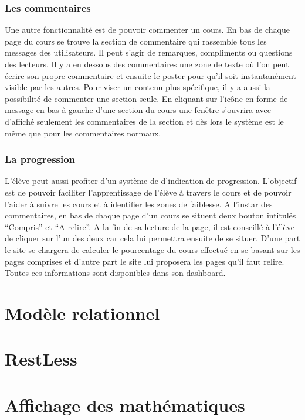 \documentclass[letterpaper,10pt,english]{sphinxmanual}
\begin{document}
\subsection{Les commentaires}
\label{functionalities:les-commentaires}
Une autre fonctionnalité est de pouvoir commenter un cours. En bas de chaque page du cours se trouve la section de commentaire qui rassemble tous les messages des utilisateurs. Il peut s'agir de remarques, compliments ou questions des lecteurs. Il y a en dessous des commentaires une zone de texte où l'on peut écrire son propre commentaire et ensuite le poster pour qu'il soit instantanément visible par les autres. Pour viser un contenu plus spécifique, il y a aussi la possibilité de commenter une section seule. En cliquant sur l'icône en forme de message en bas à gauche d'une section du cours une fenêtre s'ouvrira avec d'affiché seulement les commentaires de la section et dès lors le système est le même que pour les commentaires normaux.


\subsection{La progression}
\label{functionalities:la-progression}
L'élève peut aussi profiter d'un système de d'indication de progression. L'objectif est de pouvoir faciliter l'apprentissage de l'élève à travers le cours et de pouvoir l'aider à suivre les cours et à identifier les zones de faiblesse. A l'instar des commentaires, en bas de chaque page d'un cours se situent deux bouton intitulés ``Compris'' et ``A relire''. A la fin de sa lecture de la page, il est conseillé à l'élève de cliquer sur l'un des deux car cela lui permettra ensuite de se situer. D'une part le site se chargera de calculer le pourcentage du cours effectué en se basant sur les pages comprises et d'autre part le site lui proposera les pages qu'il faut relire. Toutes ces informations sont disponibles dans son dashboard.


\chapter{Modèle relationnel}
\label{models:modele-relationnel}\label{models::doc}

\chapter{RestLess}
\label{restless::doc}\label{restless:restless}

\chapter{Affichage des mathématiques}
\label{maths:affichage-des-mathematiques}\label{maths::doc}
\end{document}
